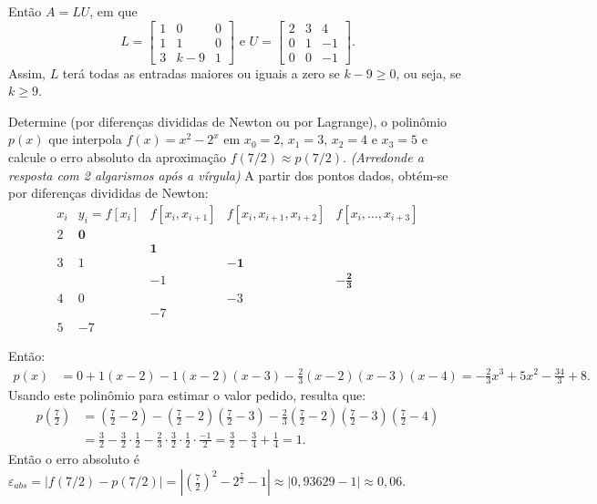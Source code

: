 \documentclass[12pt,a4paper]{article}
\begin{document}
\begin{ExerciseList}
Então $A = LU$, em que
\[
L =
\begin{bmatrix}
1 & 0 & 0 \\
1 & 1 & 0 \\
3 & k - 9 & 1
\end{bmatrix}
\text{ e }
U =
\begin{bmatrix}
2 & 3 & 4 \\
0 & 1 & -1 \\
0 & 0 & -1
\end{bmatrix}.
\]
Assim, $L$ terá todas as entradas maiores ou iguais a zero se $k - 9 \geq 0$, ou seja, se $\boxed{k \geq 9}$.


\Exercise[title={2,0}] Determine (por diferenças divididas de Newton ou por Lagrange), o polinômio $p(x)$ que interpola $f(x) = x^2 - 2^x$ em $x_0 = 2$, $x_1 = 3$, $x_2 = 4$ e $x_3 = 5$ e calcule o erro absoluto da aproximação $f(7/2) \approx p(7/2)$.
{\color{blue} \textit{(Arredonde a resposta com 2 algarismos após a vírgula)}}
\Answer A partir dos pontos dados, obtém-se por diferenças divididas de Newton:
\[
\begin{array}{cccccc}
x_i
& y_i=f[x_i]
& f[x_i,x_{i+1}]
& f[x_i,x_{i+1},x_{i+2}]
& f[x_i,\ldots,x_{i+3}]\\
2 & \mathbf{0} \\
  & & \mathbf{1} \\
3 & 1 & & \mathbf{-1} \\
  & & -1 & & \mathbf{-\frac{2}{3}} \\
4 & 0 & & -3\\
  & & -7 \\
5 & -7
\end{array}
\]

Então:
\begin{align*}
p(x)
&=0
 +1 (x-2)
 -1 (x-2)(x-3)
 -\frac{2}{3} (x-2)(x-3)(x-4)
  = \boxed{-\frac{2}{3}x^3 + 5x^2 - \frac{34}{3} + 8}.
\end{align*}
Usando este polinômio para estimar o valor pedido, resulta que:
\begin{align*}
  p\left(\frac{7}{2}\right)
  & =\left(\frac{7}{2}-2\right)
  -\left(\frac{7}{2}-2\right)\left(\frac{7}{2}-3\right)
  -\frac{2}{3} \left(\frac{7}{2}-2\right)\left(\frac{7}{2}-3\right)\left(\frac{7}{2}-4\right) \\
  & =\frac{3}{2}
  -\frac{3}{2} \cdot \frac{1}{2}
  -\frac{2}{3} \cdot \frac{3}{2}\cdot \frac{1}{2}\cdot \frac{-1}{2}
  =\frac{3}{2}
  -\frac{3}{4}
  +\frac{1}{4}
  = 1.
\end{align*}
Então o erro absoluto é $\varepsilon_{abs} = |f(7/2) - p(7/2)| = \left|\left(\frac{7}{2}\right)^2 - 2^{\frac{7}{2}} - 1 \right| \approx |0,93629 - 1| \approx \boxed{0,06}$.


\end{ExerciseList}
\end{document}
